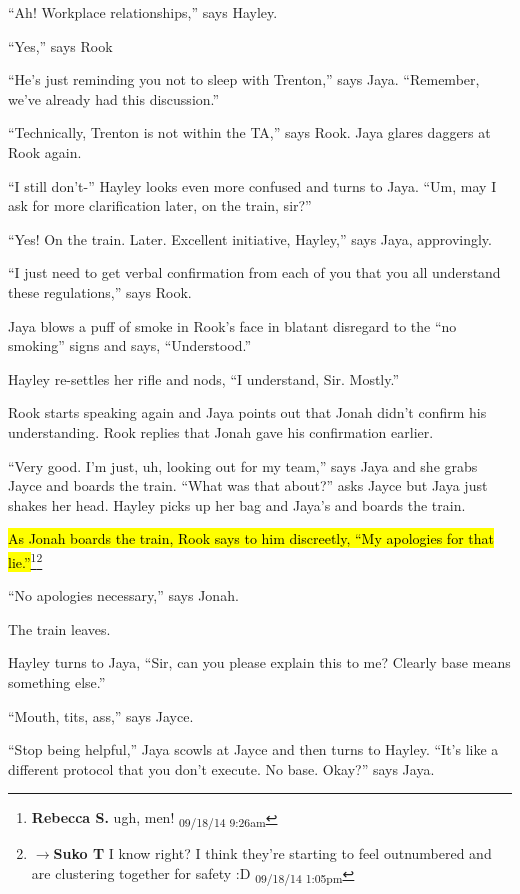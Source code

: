 ``Ah!  Workplace relationships,'' says Hayley.

``Yes,'' says Rook

``He's just reminding you not to sleep with Trenton,'' says Jaya.  ``Remember, we've already had this discussion.''

``Technically, Trenton is not within the TA,'' says Rook.  Jaya glares daggers at Rook again.

``I still don't-'' Hayley looks even more confused and turns to Jaya. ``Um, may I ask for more clarification later, on the train, sir?''

``Yes!  On the train. Later.  Excellent initiative, Hayley,'' says Jaya, approvingly.

``I just need to get verbal confirmation from each of you that you all understand these regulations,'' says Rook.

Jaya blows a puff of smoke in Rook's face in blatant disregard to the ``no smoking'' signs and says, ``Understood.''

Hayley re-settles her rifle and nods, ``I understand, Sir.  Mostly.''

Rook starts speaking again and Jaya points out that Jonah didn't confirm his understanding.  Rook replies that Jonah gave his confirmation earlier.  

``Very good.  I'm just, uh, looking out for my team,'' says Jaya and she grabs Jayce and boards the train.  ``What was that about?'' asks Jayce but Jaya just shakes her head. Hayley picks up her bag and Jaya's and boards the train.

\hl{As Jonah boards the train, Rook says to him discreetly, ``My apologies for that lie.''}\footnote{\textbf{Rebecca S. }ugh, men! \textsubscript{09/18/14 9:26am}}\footnote{$\rightarrow$\textbf{Suko T }I know right?  I think they're starting to feel outnumbered and are clustering together for safety  :D \textsubscript{09/18/14 1:05pm}}

``No apologies necessary,'' says Jonah.

The train leaves.



Hayley turns to Jaya, ``Sir, can you please explain this to me?  Clearly base means something else.''

``Mouth, tits, ass,'' says Jayce.

``Stop being helpful,'' Jaya scowls at Jayce and then turns to Hayley.  ``It's like a different protocol that you don't execute.  No base.  Okay?'' says Jaya.

